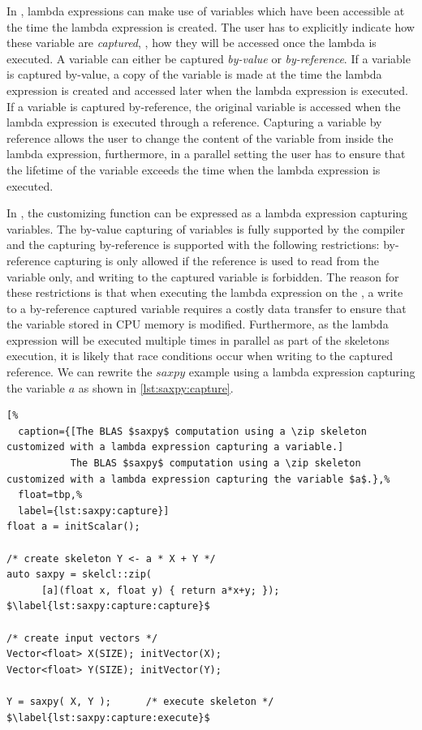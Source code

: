 \bigskip
{}
In \Cpp, lambda expressions can make use of variables which have been accessible at the time the lambda expression is created.
The user has to explicitly indicate how these variable are \emph{captured}, \ie, how they will be accessed once the lambda is executed.
A variable can either be captured \emph{by-value} or \emph{by-reference}.
If a variable is captured by-value, a copy of the variable is made at the time the lambda expression is created and accessed later when the lambda expression is executed.
If a variable is captured by-reference, the original variable is accessed when the lambda expression is executed through a reference.
Capturing a variable by reference allows the user to change the content of the variable from inside the lambda expression, furthermore, in a parallel setting the user has to ensure that the lifetime of the variable exceeds the time when the lambda expression is executed.

In \SkelCL, the customizing function can be expressed as a lambda expression capturing variables.
The by-value capturing of variables is fully supported by the  compiler and the capturing by-reference is supported with the following restrictions:
by-reference capturing is only allowed if the reference is used to read from the variable only, and writing to the captured variable is forbidden.
The reason for these restrictions is that when executing the lambda expression on the \GPU, a write to a by-reference captured variable requires a costly data transfer to ensure that the variable stored in CPU memory is modified.
Furthermore, as the lambda expression will be executed multiple times in parallel as part of the skeletons execution, it is likely that race conditions occur when writing to the captured reference.
We can rewrite the $saxpy$ example using a lambda expression capturing the variable $a$ as shown in \autoref{lst:saxpy:capture}.
\begin{lstlisting}[%
  caption={[The BLAS $saxpy$ computation using a \zip skeleton customized with a lambda expression capturing a variable.]
           The BLAS $saxpy$ computation using a \zip skeleton customized with a lambda expression capturing the variable $a$.},%
  float=tbp,%
  label={lst:saxpy:capture}]
float a = initScalar();

/* create skeleton Y <- a * X + Y */
auto saxpy = skelcl::zip(
      [a](float x, float y) { return a*x+y; }); $\label{lst:saxpy:capture:capture}$

/* create input vectors */
Vector<float> X(SIZE); initVector(X);
Vector<float> Y(SIZE); initVector(Y);

Y = saxpy( X, Y );      /* execute skeleton */ $\label{lst:saxpy:capture:execute}$
\end{lstlisting}

